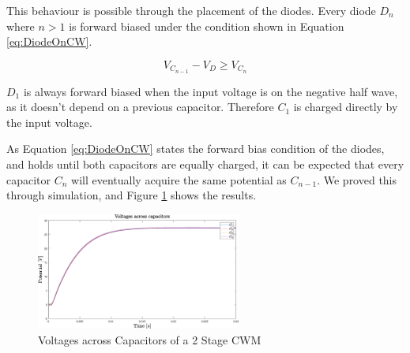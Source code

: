 This behaviour is possible through the placement of the diodes.
Every diode $D_n$ where $n > 1$ is forward biased under the condition shown in Equation \ref{eq:DiodeOnCW}.

\begin{equation}
	V_{C_{n-1}}-V_D \geq V_{C_n}
	\label{eq:DiodeOnCW}
\end{equation}

$D_1$ is always forward biased when the input voltage is on the negative half wave,
as it doesn't depend on a previous capacitor.
Therefore $C_1$ is charged directly by the input voltage.

As Equation \ref{eq:DiodeOnCW} states the forward bias condition of the diodes,
and holds until both capacitors are equally charged,
it can be expected that every capacitor $C_n$ will eventually acquire the same potential as $C_{n-1}$.
We proved this through simulation,
and Figure \ref{fig:capsV} shows the results.


\begin{figure}[H]
   \centering
   \includegraphics[width=0.6\textwidth]{figures/xCockroftWalton/capsV.eps}
    \caption{Voltages across Capacitors of a 2 Stage CWM}
	\label{fig:capsV}
\end{figure}


